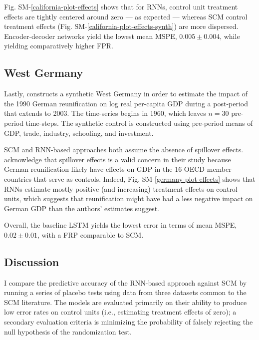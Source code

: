 \documentclass[hidelinks,12pt]{article}
\begin{document}
Fig. SM-\ref{california-plot-effects} shows that for RNNs, control unit treatment effects are tightly centered around zero --- as expected --- whereas SCM control treatment effects (Fig. SM-\ref{california-plot-effects-synth}) are more dispersed. Encoder-decoder networks yield the lowest mean MSPE, $0.005 \pm 0.004$, while yielding comparatively higher FPR.  

\subsection{West Germany} 

Lastly, \citet{abadie2015comparative} constructs a synthetic West Germany in order to estimate the impact of the 1990 German reunification on log real per-capita GDP during a post-period that extends to 2003. The time-series begins in 1960, which leaves $n=30$ pre-period time-steps. The synthetic control is constructed using pre-period means of GDP, trade, industry, schooling, and investment. 

SCM and RNN-based approaches both assume the absence of spillover effects. \citet{abadie2015comparative} acknowledge that spillover effects is a valid concern in their study because German reunification likely have effects on GDP in the 16 OECD member countries that serve as controls. Indeed, Fig. SM-\ref{germany-plot-effects} shows that RNNs estimate mostly positive (and increasing) treatment effects on control units, which suggests that reunification might have had a less negative impact on German GDP than the authors' estimates suggest.

Overall, the baseline LSTM yields the lowest error in terms of mean MSPE, $0.02 \pm 0.01$, with a FRP comparable to SCM.

\subsection{Discussion}

I compare the predictive accuracy of the RNN-based approach against SCM by running a series of placebo tests using data from three datasets common to the SCM literature. The models are evaluated primarily on their ability to produce low error rates on control units (i.e., estimating treatment effects of zero); a secondary evaluation criteria is minimizing the probability of falsely rejecting the null hypothesis of the randomization test. 
\end{document}
